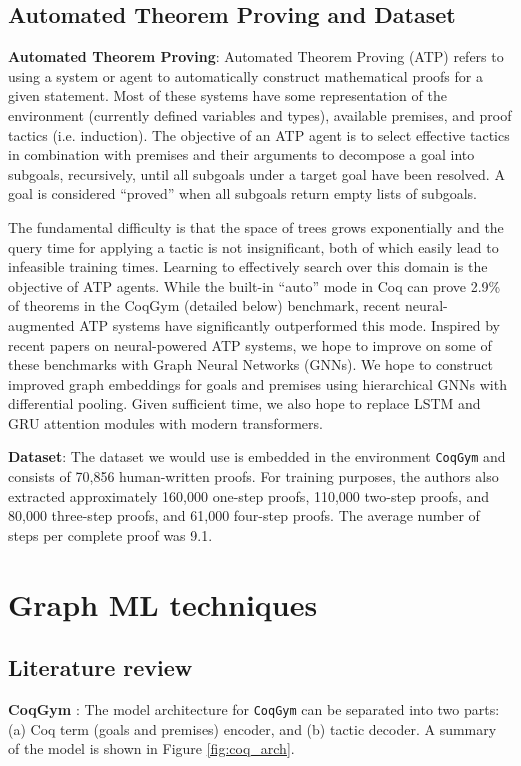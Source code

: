 \documentclass{article}
\begin{document}
\subsection{Automated Theorem Proving and Dataset}
\textbf{Automated Theorem Proving}: Automated Theorem Proving (ATP) refers to using a system or agent to automatically construct mathematical proofs for a given statement. Most of these systems have some representation of the environment (currently defined variables and types), available premises, and proof tactics (i.e. induction). The objective of an ATP agent is to select effective tactics in combination with premises and their arguments to decompose a goal into subgoals, recursively, until all subgoals under a target goal have been resolved. A goal is considered ``proved'' when all subgoals return empty lists of subgoals.

The fundamental difficulty is that the space of trees grows exponentially and the query time for applying a tactic is not insignificant, both of which easily lead to infeasible training times. Learning to effectively search over this domain is the objective of ATP agents. While the built-in ``auto'' mode in Coq can prove 2.9\% of theorems in the CoqGym (detailed below) benchmark, recent neural-augmented ATP systems have significantly outperformed this mode. Inspired by recent papers on neural-powered ATP systems, we hope to improve on some of these benchmarks with Graph Neural Networks (GNNs). We hope to construct improved graph embeddings for goals and premises using hierarchical GNNs with differential pooling. Given sufficient time, we also hope to replace LSTM and GRU attention modules with modern transformers.

\textbf{Dataset}: The dataset we would use is embedded in the environment
\texttt{CoqGym} and consists of 70,856 human-written proofs. For training
purposes, the authors also extracted approximately 160,000 one-step proofs,
110,000 two-step proofs, and 80,000 three-step proofs, and 61,000 four-step
proofs. The average number of steps per complete proof was 9.1.

\section{Graph ML techniques}
\subsection{Literature review}
\textbf{CoqGym} \cite{coqgym}: The model architecture for \texttt{CoqGym} can be separated into two parts: (a) Coq term (goals and premises) encoder, and (b) tactic decoder. A summary of the model is shown in Figure \ref{fig:coq_arch}.
\end{document}
